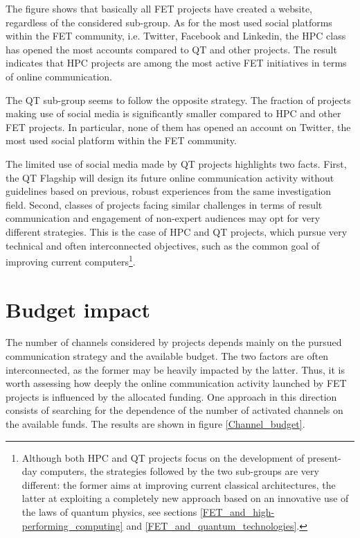 The figure shows that basically all FET projects have created a website, regardless of the considered sub-group. As for the most used social platforms within the FET community, i.e. Twitter, Facebook and Linkedin, the HPC class has opened the most accounts compared to QT and other projects. The result indicates that HPC projects are among the most active FET initiatives in terms of online communication.  

The QT sub-group seems to follow the opposite strategy. The fraction of projects making use of social media is significantly smaller compared to HPC and other FET projects. In particular, none of them has opened an account on Twitter, the most used social platform within the FET community. 

The limited use of social media made by QT projects highlights two facts. First, the QT Flagship will design its future online communication activity without guidelines based on previous, robust experiences from the same investigation field. Second, classes of projects facing similar challenges in terms of result communication and engagement of non-expert audiences may opt for very different strategies. This is the case of HPC and QT projects, which pursue very technical and often interconnected objectives, such as the common goal of improving current computers\footnote{Although both HPC and QT projects focus on the development of present-day computers, the strategies followed by the two sub-groups are very different: the former aims at improving current classical architectures, the latter at exploiting a completely new approach based on an innovative use of the laws of quantum physics, see sections \ref{FET_and_high-performing_computing} and \ref{FET_and_quantum_technologies}.}.

\section{Budget impact} \label{Budget_impact}
The number of channels considered by projects depends mainly on the pursued communication strategy and the available budget. The two factors are often interconnected, as the former may be heavily impacted by the latter. Thus, it is worth assessing how deeply the online communication activity launched by FET projects is influenced by the allocated funding. One approach in this direction consists of searching for the dependence of the number of activated channels on the available funds. The results are shown in figure \ref{Channel_budget}.  

